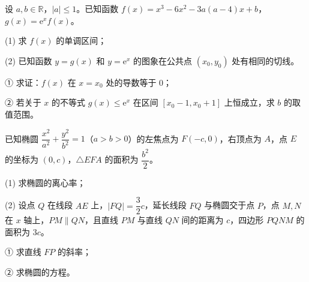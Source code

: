 \begin{question}
设 $a,b\in\mathbb R$，$|a|\leqslant1$。已知函数 $f(x)=x^3-6x^2-3a(a-4)x+b$，$g(x)=\mathrm e^x f(x)$。

(1)   求 $f(x)$ 的单调区间；

(2)   已知函数 $y=g(x)$ 和 $y=\mathrm e^x$ 的图象在公共点 $(x_0,y_0)$ 处有相同的切线。

① 求证：$f(x)$ 在 $x=x_0$ 处的导数等于 0；

② 若关于 $x$ 的不等式 $g(x)\leqslant\mathrm e^x$ 在区间 $[x_0-1,x_0+1]$ 上恒成立，求 $b$ 的取值范围。

\end{question}
\begin{question}
已知椭圆 $\dfrac{x^2}{a^2}+\dfrac{y^2}{b^2}=1$（$a>b>0$）的左焦点为 $F(-c,0)$，右顶点为 $A$，点 $E$ 的坐标为 $(0,c)$，$\triangle EFA$ 的面积为 $\dfrac{b^2}{2}$。

(1)   求椭圆的离心率；

(2)   设点 $Q$ 在线段 $AE$ 上，$|FQ|=\dfrac32c$，延长线段 $FQ$ 与椭圆交于点 $P$，点 $M,N$ 在 $x$ 轴上，$PM\parallel QN$，且直线 $PM$ 与直线 $QN$ 间的距离为 $c$，四边形 $PQNM$ 的面积为 $3c$。

① 求直线 $FP$ 的斜率；

② 求椭圆的方程。

\end{question}